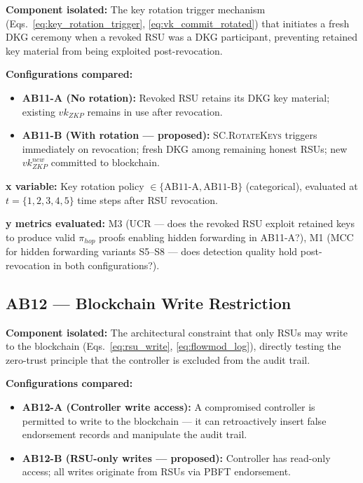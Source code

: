 \documentclass[12pt, a4paper]{report}
\begin{document}
{{\textbf{Component isolated:}
The key rotation trigger mechanism
(Eqs.~\ref{eq:key_rotation_trigger},
\ref{eq:vk_commit_rotated}) that initiates a fresh
\ac{DKG} ceremony when a revoked \ac{RSU} was a
\ac{DKG} participant, preventing retained key
material from being exploited post-revocation.

\textbf{Configurations compared:}
\begin{itemize}
    \item \textbf{AB11-A (No rotation):} Revoked
    \ac{RSU} retains its \ac{DKG} key material;
    existing $vk_{ZKP}$ remains in use after
    revocation.
    \item \textbf{AB11-B (With rotation —
    proposed):} \textsc{SC.RotateKeys} triggers
    immediately on revocation; fresh \ac{DKG}
    among remaining honest \ac{RSU}s; new
    $vk_{ZKP}^{new}$ committed to blockchain.
\end{itemize}

\textbf{x variable:} Key rotation policy
$\in \{\text{AB11-A}, \text{AB11-B}\}$ (categorical),
evaluated at $t = \{1, 2, 3, 4, 5\}$ time steps
after RSU revocation.

\textbf{y metrics evaluated:} M3 (UCR — does the
revoked RSU exploit retained keys to produce valid
$\pi_{hop}$ proofs enabling hidden forwarding in
AB11-A?), M1 (MCC for hidden forwarding variants
S5--S8 — does detection quality hold post-revocation
in both configurations?).


\subsection{AB12 — Blockchain Write Restriction}
\label{sec:ab12}

\textbf{Component isolated:}
The architectural constraint that only \ac{RSU}s
may write to the blockchain
(Eqs.~\ref{eq:rsu_write}, \ref{eq:flowmod_log}),
directly testing the zero-trust principle that the
controller is excluded from the audit trail.

\textbf{Configurations compared:}
\begin{itemize}
    \item \textbf{AB12-A (Controller write access):}
    A compromised controller is permitted to write
    to the blockchain — it can retroactively insert
    false endorsement records and manipulate the
    audit trail.
    \item \textbf{AB12-B (RSU-only writes —
    proposed):} Controller has read-only access;
    all writes originate from \ac{RSU}s via
    \ac{PBFT} endorsement.
\end{itemize}

}}
\end{document}
